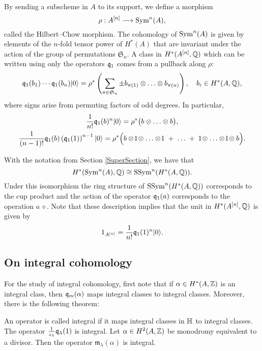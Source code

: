 By sending a subscheme in $A$ to its support, we define a morphism
$$
\rho : A^{[n]} \longrightarrow \operatorname{Sym}^n(A),
$$
called the Hilbert--Chow morphism. The cohomology of $\operatorname{Sym}^n(A)$ is given by elements of the $n$-fold tensor power of $H^*(A)$ that are invariant under the action of the group of permutations $\mathfrak{S}_n$. A class in $H^*(A^{[n]},\mathbb{Q})$ which can be written using only the operators $\mathfrak{q}_1$ comes from a pullback along $\rho$:
\begin{equation}
\label{qSym}
\mathfrak{q}_1(b_1)\cdots \mathfrak{q}_1(b_n)|0\rangle = \rho^*\left( \sum_{\pi\in\mathfrak{S}_n } \pm b_{\pi(1)}\otimes\ldots\otimes b_{\pi(n)} \right), \quad b_i\in H^*(A,\mathbb{Q}),
\end{equation}
where signs arise from permuting factors of odd degrees. In particular,
\begin{gather} \label{q0primitive}
\frac{1}{n!}\mathfrak{q}_1(b)^n |0\rangle = \rho^*\big( b\otimes \ldots \otimes b\big),
\\ \label{q1primitive}
\frac{1}{(n-1)!}\mathfrak{q}_1(b)\left(\mathfrak{q}_1(1)\right)^{n-1}|0\rangle =\rho^*\Big( b\otimes\! 1\!\otimes\ldots\otimes\! 1\; + \;\ldots\; +\; 1\!\otimes\ldots\otimes\! 1\! \otimes b\Big) .
\end{gather}
\begin{remark}
With the notation from Section \ref{SuperSection}, we have that
$$
H^*(\operatorname{Sym}^n(A),\mathbb{Q}) \cong \operatorname{SSym}^n(H^*(A,\mathbb{Q})).
$$
Under this isomorphism the ring structure of $\operatorname{SSym}^n(H^*(A,\mathbb{Q}))$ corresponds to the cup product and the action of the operator $\mathfrak{q}_1(a)$ corresponds to the operation $a\,\diamond$.
Note that these description implies that the unit in $H^*(A^{[n]},\mathbb{Q})$ is given by
$$
1_{A^{[n]}} = \frac{1}{n!} \mathfrak{q}_1(1)^n|0\rangle.
$$
\end{remark}

\subsection{On integral cohomology}

For the study of integral cohomology, first note that if $\alpha \in H^*(A,\mathbb{Z})$ is an integral class, then $\mathfrak{q}_{m}(\alpha) $ maps integral classes to integral classes. 
Moreover, there is the following theorem:
\begin{theorem} \cite{QinWang} \label{IntegralOperators}
An operator is called integral if it maps integral classes in $\mathbb{H}$ to integral classes. The operator $\frac{1}{z_\lambda}\mathfrak{q}_{\lambda}(1)$ is integral. Let $\alpha \in H^2(A,\mathbb{Z})$ be monodromy equivalent to a divisor. Then the operator $\mathfrak{m}_{\lambda}(\alpha)$ is integral.
\end{theorem}


